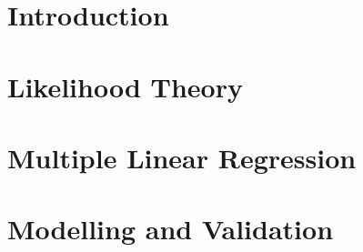 \chapter{Introduction}
%

\chapter{Likelihood Theory}
\label{ch:likelihood_theory}

\chapter{Multiple Linear Regression}\label{ch:Multip_linear_regresssion}



\chapter{Modelling and Validation}
\label{ch:hypothesis_testing}


%